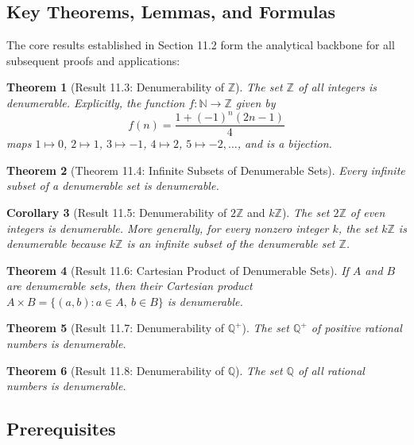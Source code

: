 \documentclass[11pt, letterpaper]{article}
\newtheorem{theorem}{Theorem}[section]
\newtheorem{corollary}[theorem]{Corollary}
\theoremstyle{definition}
\theoremstyle{remark}
\begin{document}
\subsection{Key Theorems, Lemmas, and Formulas}

The core results established in Section 11.2 form the analytical backbone for all subsequent proofs and applications:

\begin{theorem}[Result 11.3: Denumerability of $\mathbb{Z}$]
The set $\mathbb{Z}$ of all integers is denumerable. Explicitly, the function $f : \mathbb{N} \to \mathbb{Z}$ given by
\[
f(n) = \frac{1 + (-1)^n (2n - 1)}{4}
\]
maps $1 \mapsto 0$, $2 \mapsto 1$, $3 \mapsto -1$, $4 \mapsto 2$, $5 \mapsto -2, \dots$, and is a bijection.
\end{theorem}

\begin{theorem}[Theorem 11.4: Infinite Subsets of Denumerable Sets]
Every infinite subset of a denumerable set is denumerable.
\end{theorem}

\begin{corollary}[Result 11.5: Denumerability of $2\mathbb{Z}$ and $k\mathbb{Z}$]
The set $2\mathbb{Z}$ of even integers is denumerable. More generally, for every nonzero integer $k$, the set $k\mathbb{Z}$ is denumerable because $k\mathbb{Z}$ is an infinite subset of the denumerable set $\mathbb{Z}$.
\end{corollary}

\begin{theorem}[Result 11.6: Cartesian Product of Denumerable Sets]
If $A$ and $B$ are denumerable sets, then their Cartesian product $A \times B = \{(a, b) : a \in A,\ b \in B\}$ is denumerable.
\end{theorem}

\begin{theorem}[Result 11.7: Denumerability of $\mathbb{Q}^+$]
The set $\mathbb{Q}^+$ of positive rational numbers is denumerable.
\end{theorem}

\begin{theorem}[Result 11.8: Denumerability of $\mathbb{Q}$]
The set $\mathbb{Q}$ of all rational numbers is denumerable.
\end{theorem}

\subsection{Prerequisites}
\end{document}
